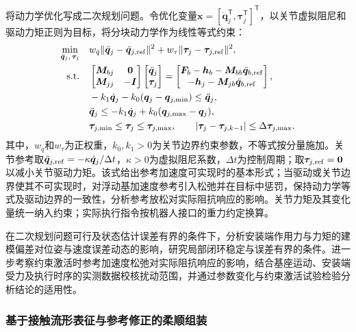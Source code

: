 \documentclass[UTF8,a4paper,zihao=-4,fontset=fandol]{ctexart}
\begin{document}
将动力学优化写成二次规划问题。令优化变量$\bm x=[\ddot{\bm q}_j^{\mathsf T},\bm\tau_j^{\mathsf T}]^{\mathsf T}$，以关节虚拟阻尼和驱动力矩正则为目标，将分块动力学作为线性等式约束：
\begin{equation}
\begin{aligned}
 \min_{\ddot{\bm q}_j,\,\bm\tau_j}\quad &
 w_{\ddot q}\|\ddot{\bm q}_j-\ddot{\bm q}_{j,\rm ref}\|^2
 +w_\tau\|\bm\tau_j-\bm\tau_{j,\rm ref}\|^2,\\
 \mathrm{s.t.}\quad &
 \begin{bmatrix}\bm M_{bj}&\bm 0\\\bm M_{jj}&-\bm I\end{bmatrix}
 \begin{bmatrix}\ddot{\bm q}_j\\\bm\tau_j\end{bmatrix}
 =\begin{bmatrix}
 \bm F_b-\bm h_b-\bm M_{bb}\ddot{\bm q}_{b,\rm ref}\\
 -\bm h_j-\bm M_{jb}\ddot{\bm q}_{b,\rm ref}
 \end{bmatrix},\\
 &-k_1\dot{\bm q}_j-k_0(\bm q_j-\bm q_{j,\min})
 \le\ddot{\bm q}_j,\\
 &\ddot{\bm q}_j\le-k_1\dot{\bm q}_j+k_0(\bm q_{j,\max}-\bm q_j),\\
 &\bm\tau_{j,\min}\le\bm\tau_j\le\bm\tau_{j,\max},\qquad
 |\bm\tau_j-\bm\tau_{j,k-1}|\le\Delta\bm\tau_{j,\max}.
\end{aligned}
\label{eq:qp}
\end{equation}
其中，$w_{\ddot q}$和$w_\tau$为正权重，$k_0,k_1>0$为关节边界约束参数，不等式按分量施加。关节参考取$\ddot{\bm q}_{j,\rm ref}=-\kappa\dot{\bm q}_j/\Delta t$，$\kappa>0$为虚拟阻尼系数，$\Delta t$为控制周期；取$\bm\tau_{j,\rm ref}=\bm 0$以减小关节驱动力矩。该式给出参考加速度可实现时的基本形式；当驱动或关节边界使其不可实现时，对浮动基加速度参考引入松弛并在目标中惩罚，保持动力学等式及驱动边界的一致性，分析参考放松对实际阻抗响应的影响。关节力矩及其变化量统一纳入约束；实际执行指令按机器人接口的重力约定换算。

在二次规划问题可行及状态估计误差有界的条件下，分析安装端作用力与力矩的建模偏差对位姿与速度误差动态的影响，研究局部闭环稳定与误差有界的条件。进一步考察约束激活时参考加速度松弛对实际阻抗响应的影响，结合基座运动、安装端受力及执行时序的实测数据校核扰动范围，并通过参数变化与约束激活试验检验分析结论的适用性。

\subsubsection{基于接触流形表征与参考修正的柔顺组装}
\end{document}
